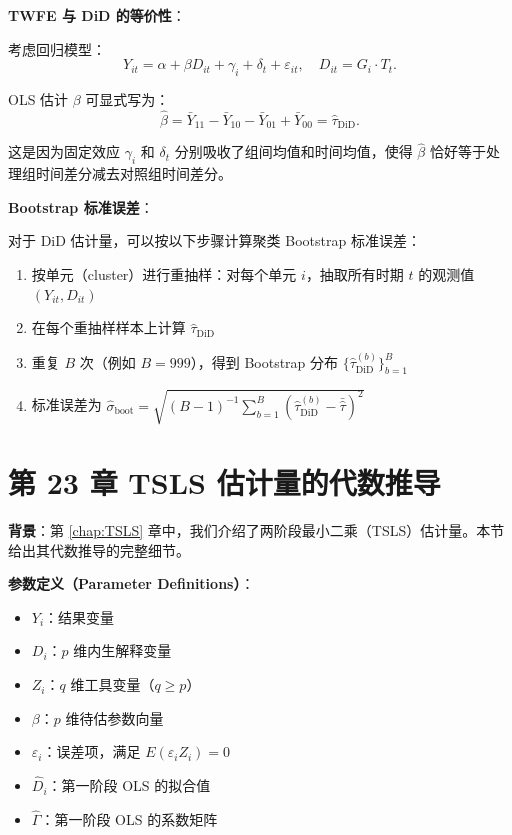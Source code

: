\textbf{TWFE 与 DiD 的等价性}：

考虑回归模型：
\[
Y_{it} = \alpha + \beta D_{it} + \gamma_i + \delta_t + \varepsilon_{it},
\quad D_{it} = G_i \cdot T_t.
\]

OLS 估计 $\beta$ 可显式写为：
\[
\hat{\beta} = \bar{Y}_{11} - \bar{Y}_{10} - \bar{Y}_{01} + \bar{Y}_{00} = \hat{\tau}_\text{DiD}.
\]

这是因为固定效应 $\gamma_i$ 和 $\delta_t$ 分别吸收了组间均值和时间均值，使得 $\hat{\beta}$ 恰好等于处理组时间差分减去对照组时间差分。

\textbf{Bootstrap 标准误差}：

对于 DiD 估计量，可以按以下步骤计算聚类 Bootstrap 标准误差：
\begin{enumerate}
  \item 按单元（cluster）进行重抽样：对每个单元 $i$，抽取所有时期 $t$ 的观测值 $(Y_{it}, D_{it})$
  \item 在每个重抽样样本上计算 $\hat{\tau}_\text{DiD}$
  \item 重复 $B$ 次（例如 $B=999$），得到 Bootstrap 分布 $\{\hat{\tau}_\text{DiD}^{(b)}\}_{b=1}^B$
  \item 标准误差为 $\hat{\sigma}_\text{boot} = \sqrt{(B-1)^{-1} \sum_{b=1}^B (\hat{\tau}_\text{DiD}^{(b)} - \bar{\hat{\tau}})^2}$
\end{enumerate}

\section{第 23 章 TSLS 估计量的代数推导}\label{sec:appendix-TSLS-derivation}

\textbf{背景}：第 \cref{chap:TSLS} 章中，我们介绍了两阶段最小二乘（TSLS）估计量。本节给出其代数推导的完整细节。

\textbf{参数定义（Parameter Definitions）}：
\begin{itemize}
  \item $Y_i$：结果变量
  \item $D_i$：$p$ 维内生解释变量
  \item $Z_i$：$q$ 维工具变量（$q \geq p$）
  \item $\beta$：$p$ 维待估参数向量
  \item $\varepsilon_i$：误差项，满足 $E(\varepsilon_i Z_i) = 0$
  \item $\hat{D}_i$：第一阶段 OLS 的拟合值
  \item $\hat{\Gamma}$：第一阶段 OLS 的系数矩阵
\end{itemize}

